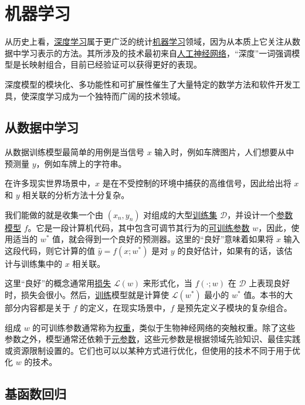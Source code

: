 \chapter{机器学习}

从历史上看，\underline{深度学习}属于更广泛的统计\underline{机器学习}领域，因为从本质上它关注从数据中学习表示的方法。其所涉及的技术最初来自\underline{人工神经网络}，``深度''一词强调模型是长映射组合，目前已经验证可以获得更好的表现。

深度模型的模块化、多功能性和可扩展性催生了大量特定的数学方法和软件开发工具，使深度学习成为一个独特而广阔的技术领域。

\section{从数据中学习}

从数据训练模型最简单的用例是当信号 $x$ 输入时，例如车牌图片，人们想要从中预测量 $y$，例如车牌上的字符串。

在许多现实世界场景中，$x$ 是在不受控制的环境中捕获的高维信号，因此给出将 $x$ 和 $y$ 相关联的分析方法十分复杂。

我们能做的就是收集一个由 $(x_n, y_n)$ 对组成的大型\underline{训练集} $\mathcal{D}$，并设计一个\underline{参数模型} $f$。它是一段计算机代码，其中包含可调节其行为的\underline{可训练参数} $w$，因此，使用适当的 $w^*$ 值，就会得到一个良好的预测器。这里的``良好''意味着如果将 $x$ 输入这段代码，则它计算的值 $\hat{y}= f(x;w^*)$ 是对 $y$ 的良好估计，如果有的话，该估计与训练集中的 $x$ 相关联。

这里``良好''的概念通常用\underline{损失} $\mathcal{L}(w)$ 来形式化，当 $f(\cdot;w)$ 在 $\mathcal{D}$ 上表现良好时，损失会很小。然后，\underline{训练}模型就是计算使 $\mathcal{L}(w^*)$ 最小的 $w^*$ 值。本书的大部分内容都是关于 $f$ 的定义，在现实场景中，$f$ 是预先定义子模块的复杂组合。

组成 $w$ 的可训练参数通常称为\underline{权重}，类似于生物神经网络的突触权重。除了这些参数之外，模型通常还依赖于\underline{元参数}，这些元参数是根据领域先验知识、最佳实践或资源限制设置的。它们也可以以某种方式进行优化，但使用的技术不同于用于优化 $w$ 的技术。

\section{基函数回归}\label{sec1.2}


